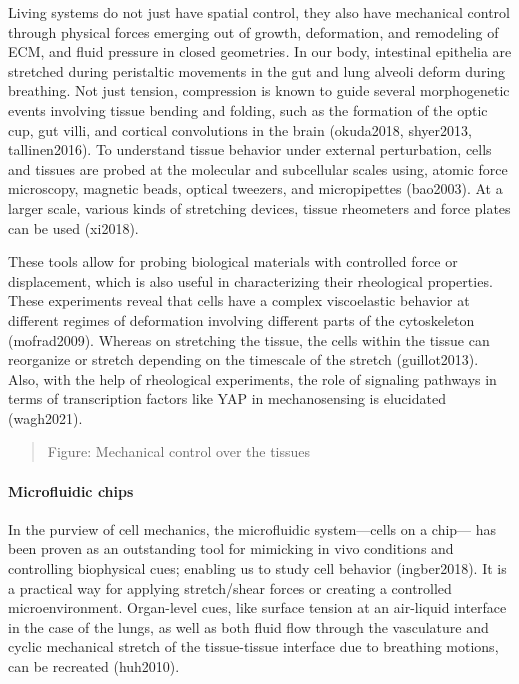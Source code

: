 \documentclass[
]{article}
\begin{document}
Living systems do not just have spatial control, they also have
mechanical control through physical forces emerging out of growth,
deformation, and remodeling of ECM, and fluid pressure in closed
geometries\emph{.} In our body, intestinal epithelia are stretched
during peristaltic movements in the gut and lung alveoli deform during
breathing. Not just tension, compression is known to guide several
morphogenetic events involving tissue bending and folding, such as the
formation of the optic cup, gut villi, and cortical convolutions in the
brain (okuda2018, shyer2013, tallinen2016). To understand tissue
behavior under external perturbation, cells and tissues are probed at
the molecular and subcellular scales using, atomic force microscopy,
magnetic beads, optical tweezers, and micropipettes (bao2003). At a
larger scale, various kinds of stretching devices, tissue rheometers and
force plates can be used (xi2018).

These tools allow for probing biological materials with controlled force
or displacement, which is also useful in characterizing their
rheological properties. These experiments reveal that cells have a
complex viscoelastic behavior at different regimes of deformation
involving different parts of the cytoskeleton (mofrad2009). Whereas on
stretching the tissue, the cells within the tissue can reorganize or
stretch depending on the timescale of the stretch (guillot2013). Also,
with the help of rheological experiments, the role of signaling pathways
in terms of transcription factors like YAP in mechanosensing is
elucidated (wagh2021).

\begin{quote}
Figure: Mechanical control over the tissues
\end{quote}

\hypertarget{microfluidic-chips}{%
\paragraph{Microfluidic chips}\label{microfluidic-chips}}

In the purview of cell mechanics, the microfluidic system---cells on a
chip--- has been proven as an outstanding tool for mimicking in vivo
conditions and controlling biophysical cues; enabling us to study cell
behavior (ingber2018). It is a practical way for applying stretch/shear
forces or creating a controlled microenvironment. Organ-level cues, like
surface tension at an air-liquid interface in the case of the lungs, as
well as both fluid flow through the vasculature and cyclic mechanical
stretch of the tissue-tissue interface due to breathing motions, can be
recreated (huh2010).
\end{document}
